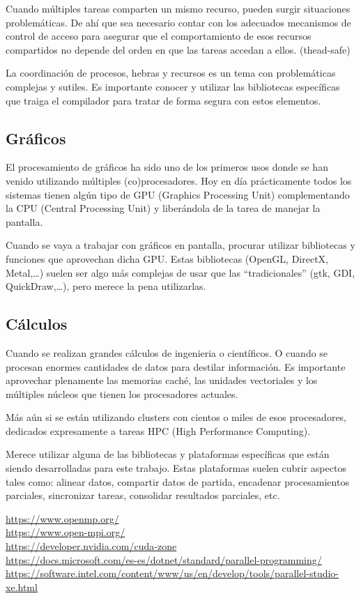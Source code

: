 \documentclass[spanish,12pt,a4paper,final,oneside]{book}
\begin{document}
Cuando múltiples tareas comparten un mismo recurso, pueden surgir situaciones problemáticas. De ahí que sea necesario contar con los adecuados mecanismos de control de acceso para asegurar que el comportamiento de esos recursos compartidos no depende del orden en que las tareas accedan a ellos. (thead-safe)

La coordinación de procesos, hebras y recursos es un tema con problemáticas complejas y sutiles. Es importante conocer y utilizar las bibliotecas específicas que traiga el compilador para tratar de forma segura con estos elementos.

\subsection{Gráficos}
El procesamiento de gráficos ha sido uno de los primeros usos donde se han venido utilizando múltiples (co)procesadores. Hoy en día prácticamente todos los sistemas tienen algún tipo de GPU (Graphics Processing Unit) complementando la CPU (Central Processing Unit) y liberándola de la tarea de manejar la pantalla. 

Cuando se vaya a trabajar con gráficos en pantalla, procurar utilizar bibliotecas y funciones que aprovechan dicha GPU. Estas bibliotecas (OpenGL, DirectX, Metal,\ldots) suelen ser algo más complejas de usar que las ``tradicionales'' (gtk, GDI, QuickDraw,\ldots), pero merece la pena utilizarlas.


\subsection{Cálculos}
Cuando se realizan grandes cálculos de ingenieria o científicos. O cuando se procesan enormes cantidades de datos para destilar información. Es importante aprovechar plenamente las memorias caché, las unidades vectoriales y los múltiples núcleos que tienen los procesadores actuales. 

Más aún si se están utilizando clusters con cientos o miles de esos procesadores, dedicados expresamente a tareas HPC (High Performance Computing). 

Merece utilizar alguna de las bibliotecas y plataformas específicas que están siendo desarrolladas para este trabajo. Estas plataformas suelen cubrir aspectos tales como: alinear datos, compartir datos de partida, encadenar procesamientos parciales, sincronizar tareas, consolidar resultados parciales, etc.

\begin{scriptsize}
\url{https://www.openmp.org/}
\\ \url{https://www.open-mpi.org/}
\\ \url{https://developer.nvidia.com/cuda-zone}
\\ \url{https://docs.microsoft.com/es-es/dotnet/standard/parallel-programming/}
\\ \url{https://software.intel.com/content/www/us/en/develop/tools/parallel-studio-xe.html}
\end{scriptsize}
\end{document}
